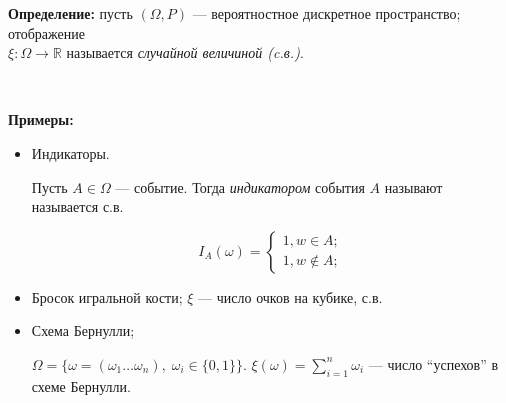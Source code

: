 \textbf{Определение:} пусть $(\Omega, P)$ --- вероятностное дискретное пространство; отображение \\ $\xi: \Omega \to \mathbb{R}$ называется \emph{случайной величиной (c.в.)}.

~\

\textbf{Примеры:} 
\begin{itemize}
    \item Индикаторы.

        Пусть $A\in \Omega$ --- событие. Тогда \emph{индикатором} события $A$ называют называется с.в.

        \[
            I_A(\omega) = \begin{cases}
                1, w \in A; \\
                1, w \not\in A;
            \end{cases}
        \]

    \item Бросок игральной кости;
    $\xi$ --- число очков на кубике, с.в.

    \item Схема Бернулли;\par
    $\Omega = \{\omega = (\omega_1 \ldots \omega_n),\; \omega_i \in \{0, 1\} \}$.
    $\xi(\omega) = \sum\limits_{i=1}^{n}\omega_i$ --- число ``успехов'' в схеме Бернулли.
\end{itemize}



